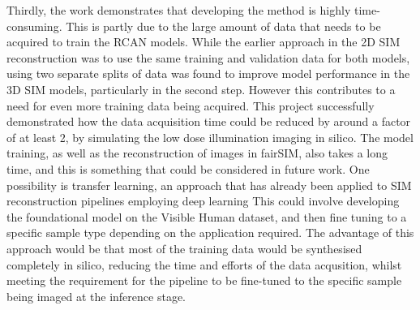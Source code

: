 \documentclass[12pt]{article}
\begin{document}
Thirdly, the work demonstrates that developing the method is highly time-consuming.
This is partly due to the large amount of data that needs to be acquired to train the RCAN models.
While the earlier approach in the 2D SIM reconstruction was to use the same training and validation data for both models,
using two separate splits of data was found to improve model performance in the 3D SIM models,
particularly in the second step.
However this contributes to a need for even more training data being acquired.
This project successfully demonstrated how the data acquisition time could be reduced by around a factor of at least 2,
by simulating the low dose illumination imaging in silico.
The model training, as well as the reconstruction of images in fairSIM,
also takes a long time, and this is something that could be considered in future work.
One possibility is transfer learning, an approach that has already been applied to SIM reconstruction pipelines employing deep learning \cite{mlsim}
This could involve developing the foundational model on the Visible Human dataset,
and then fine tuning to a specific sample type depending on the application required.
The advantage of this approach would be that most of the training data would be synthesised completely in silico,
reducing the time and efforts of the data acqusition,
whilst meeting the requirement for the pipeline to be fine-tuned to the specific sample being imaged at the inference stage.
\end{document}
